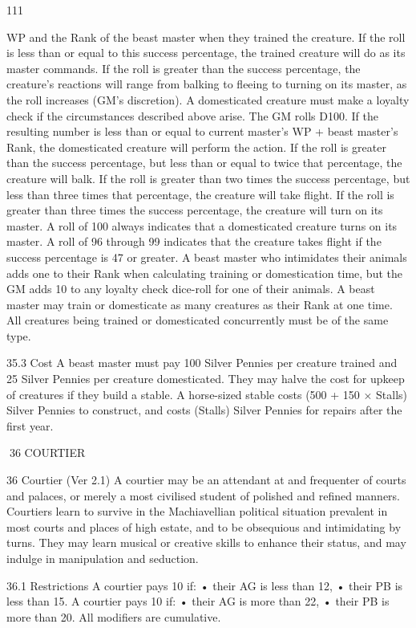 \documentclass[a4paper]{article}
\begin{document}
\begin{multicols}{3}
111

WP and the Rank of the beast master when they
trained the creature. If the roll is less than or equal
to this success percentage, the trained creature will
do as its master commands. If the roll is greater
than the success percentage, the creature’s reactions will range from balking to fleeing to turning
on its master, as the roll increases (GM’s discretion).
A domesticated creature must make a loyalty check
if the circumstances described above arise. The
GM rolls D100. If the resulting number is less than
or equal to current master’s WP + beast master’s
Rank, the domesticated creature will perform the
action. If the roll is greater than the success percentage, but less than or equal to twice that percentage, the creature will balk. If the roll is greater
than two times the success percentage, but less
than three times that percentage, the creature will
take flight. If the roll is greater than three times the
success percentage, the creature will turn on its
master. A roll of 100 always indicates that a domesticated creature turns on its master. A roll of 96
through 99 indicates that the creature takes flight if
the success percentage is 47 or greater.
A beast master who intimidates their animals adds
one to their Rank when calculating training or
domestication time, but the GM adds 10 to any
loyalty check dice-roll for one of their animals.
A beast master may train or domesticate as
many creatures as their Rank at one time.
All creatures being trained or domesticated concurrently must be of the same type.

35.3 Cost
A beast master must pay 100 Silver Pennies per
creature trained and 25 Silver Pennies per creature domesticated.
They may halve the cost for upkeep of creatures if
they build a stable. A horse-sized stable costs (500
+ 150 × Stalls) Silver Pennies to construct, and
costs (Stalls) Silver Pennies for repairs after the
first year.

36 COURTIER

36 Courtier (Ver 2.1)
A courtier may be an attendant at and frequenter of
courts and palaces, or merely a most civilised
student of polished and refined manners. Courtiers
learn to survive in the Machiavellian political
situation prevalent in most courts and places of
high estate, and to be obsequious and intimidating
by turns. They may learn musical or creative skills
to enhance their status, and may indulge in manipulation and seduction.

36.1 Restrictions
A courtier pays 10%
if:
• their AG is less than 12,
• their PB is less than 15.
A courtier pays 10%
if:
• their AG is more than 22,
• their PB is more than 20. All modifiers are cumulative.


\end{multicols}
\end{document}
